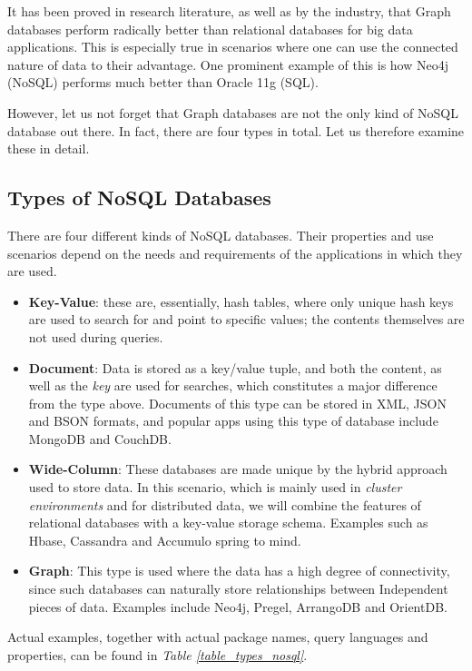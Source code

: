 \documentclass[10pt,        %
               a4paper,     %
               journal,     %
               ]{IEEEtran}
\begin{document}
It has been proved in research literature, as well as by the industry, that Graph databases perform radically better than relational databases for big data applications. \cite{IEEEpaper1:comparison} This is especially true in scenarios where one can use the connected nature of data to their advantage. One prominent example of this is how Neo4j (NoSQL) performs much better than Oracle 11g (SQL). \cite{comparison_2015} \par
However, let us not forget that Graph databases are not the only kind of NoSQL database out there. In fact, there are four types in total. Let us therefore examine these in detail.
\subsection{Types of NoSQL Databases}
There are four different kinds of NoSQL databases. Their properties and use scenarios depend on the needs and requirements of the applications in which they are used. 
\begin{itemize}
	\item \textbf{Key-Value}: these are, essentially, hash tables, where only unique hash keys are used to search for and point to specific values; the contents themselves are not used during queries.
	\item \textbf{Document}: Data is stored as a key/value tuple, and both the content, as well as the \textit{key} are used for searches, which constitutes a major difference from the type above. Documents of this type can be stored in XML, JSON and BSON formats, and popular apps using this type of database include MongoDB and CouchDB.
	\item \textbf{Wide-Column}: These databases are made unique by the hybrid approach used to store data. In this scenario, which is mainly used in \textit{cluster environments} and for distributed data, we will combine the features of relational databases with a key-value storage schema. Examples such as Hbase, Cassandra and Accumulo spring to mind.
	\item \textbf{Graph}: This type is used where the data has a high degree of connectivity, since such databases can naturally store relationships between Independent pieces of data. Examples include Neo4j, Pregel, ArrangoDB and OrientDB. 
\end{itemize}
Actual examples, together with actual package names, query languages and properties, can be found in \textit{Table \ref{table_types_nosql}}. \cite{IEEEpaper1:comparison}
\end{document}

